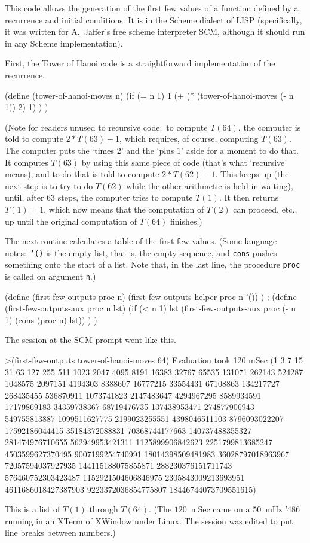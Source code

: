 \announcecomputercode
This code allows the generation of the first few values of a function 
defined by a recurrence and initial conditions.
It is in the Scheme dialect of LISP
(specifically, it was written for A.~Jaffer's free scheme interpreter SCM, 
although it should run in any Scheme implementation).

First,
the Tower of Hanoi code is a straightforward implementation of the recurrence.
\begin{computercode}
(define (tower-of-hanoi-moves n) 
    (if (= n 1)
       1
       (+ (* (tower-of-hanoi-moves (- n 1)) 
              2) 
           1) )  )
\end{computercode}
\noindent (Note for readers unused to recursive code:~to compute $T(64)$, 
the computer is told to compute $2*T(63)-1$, which requires, of course,
computing $T(63)$.
The computer puts the `times $2$' and the `plus $1$' aside for a moment
to do that.
It computes  $T(63)$ by using this same piece of code (that's 
what `recursive' means), and to do that is told to compute $2*T(62)-1$.
This keeps up (the next step is to try to do $T(62)$ while the other 
arithmetic is held in waiting), until, after $63$ steps, the computer
tries to compute $T(1)$.
It then returns $T(1)=1$, 
which now means that the computation of $T(2)$ can proceed,
etc., up until the original computation of $T(64)$ finishes.)

The next routine calculates a table of the first few 
values.
(Some language notes:~\texttt{'()} is the empty list, that is, 
the empty sequence, and \texttt{cons} pushes something onto the start of a 
list.
Note that, in the last line, the procedure \texttt{proc}
is called on argument \texttt{n}.)
\begin{computercode}
(define (first-few-outputs proc n)
    (first-few-outputs-helper proc n '()) )
;
(define (first-few-outputs-aux proc n lst)
    (if (< n 1)
    lst 
    (first-few-outputs-aux proc (- n 1) (cons (proc n) lst)) ) )
\end{computercode}
\noindent The session at the SCM prompt went like this.
\begin{computercode}
>(first-few-outputs tower-of-hanoi-moves 64)
Evaluation took 120 mSec
(1 3 7 15 31 63 127 255 511 1023 2047 4095 8191 16383 32767 
65535 131071 262143 524287 1048575 2097151 4194303 8388607 
16777215 33554431 67108863 134217727 268435455 536870911 
1073741823 2147483647 4294967295 8589934591 17179869183 
34359738367 68719476735 137438953471 274877906943 549755813887 
1099511627775 2199023255551 4398046511103 8796093022207 
17592186044415 35184372088831 70368744177663 140737488355327 
281474976710655 562949953421311 1125899906842623 
2251799813685247 4503599627370495 9007199254740991 
18014398509481983 36028797018963967 72057594037927935 
144115188075855871 288230376151711743 576460752303423487 
1152921504606846975 2305843009213693951 4611686018427387903 
9223372036854775807 18446744073709551615)
\end{computercode}
\noindent This is a list of $T(1)$ through $T(64)$.
(The $120$~mSec came on a 50~mHz '486 running in an XTerm of XWindow
under Linux.
The session was edited to put line breaks between numbers.)
\endinput

